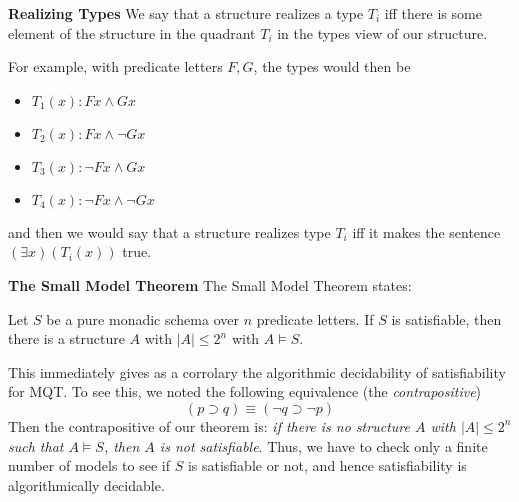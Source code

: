 \begin{mdframed}[linewidth=1]
\textbf{Realizing Types} 
We say that a structure realizes a type $T_i$ iff there is some element of the structure in the quadrant $T_i$ in the types view of our structure. 

For example, with predicate letters $F, G$, the types would then be 
\begin{itemize}
    \item $T_1(x): Fx \land Gx$

    \item $T_2(x): Fx \land \lnot Gx$

    \item $T_3(x): \lnot Fx \land Gx$

    \item $T_4(x): \lnot Fx \land \lnot Gx$
\end{itemize}
and then we would say that a structure realizes type $T_i$ iff it makes the sentence $(\exists x)(T_i(x))$ true. 

\textbf{The Small Model Theorem}
The Small Model Theorem states:
\begin{theorem}
Let $S$ be a pure monadic schema over $n$ predicate letters. If $S$ is satisfiable, then there is a structure $A$ with $|A| \leq 2^n$ with $A \models S$. 
\end{theorem}

This immediately gives as a corrolary the algorithmic decidability of satisfiability for MQT. To see this, we noted the following equivalence (the \emph{contrapositive})
\[
    (p \supset q) \equiv (\lnot q \supset \lnot p)
\]
Then the contrapositive of our theorem is: \emph{if there is no structure $A$ with $|A| \leq 2^n$ such that $A \models S$, then $A$ is not satisfiable}. Thus, we have to check only a finite number of models to see if $S$ is satisfiable or not, and hence satisfiability is algorithmically decidable. 

\end{mdframed}



